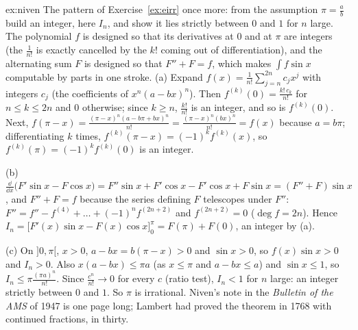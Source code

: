 \begin{solution}{ex:niven}
\idea The pattern of Exercise~\ref{ex:eirr} once more: from the assumption $\pi=\frac ab$ build an integer, here $I_n$, and show it lies strictly between $0$ and $1$ for $n$ large. The polynomial $f$ is designed so that its derivatives at $0$ and at $\pi$ are integers (the $\frac1{n!}$ is exactly cancelled by the $k!$ coming out of differentiation), and the alternating sum $F$ is designed so that $F''+F=f$, which makes $\int f\sin x$ computable by parts in one stroke.
\writeup (a) Expand $f(x)=\frac1{n!}\sum_{j=n}^{2n}c_jx^j$ with integers $c_j$ (the coefficients of $x^n(a-bx)^n$). Then $f^{(k)}(0)=\frac{k!\,c_k}{n!}$ for $n\le k\le2n$ and $0$ otherwise; since $k\ge n$, $\frac{k!}{n!}$ is an integer, and so is $f^{(k)}(0)$. Next, $f(\pi-x)=\frac{(\pi-x)^n(a-b\pi+bx)^n}{n!}=\frac{(\pi-x)^n(bx)^n}{n!}=f(x)$ because $a=b\pi$; differentiating $k$ times, $f^{(k)}(\pi-x)=(-1)^kf^{(k)}(x)$, so $f^{(k)}(\pi)=(-1)^kf^{(k)}(0)$ is an integer.

(b) $\frac{\dd}{\dd x}\bigl(F'\sin x-F\cos x\bigr)=F''\sin x+F'\cos x-F'\cos x+F\sin x=(F''+F)\sin x$, and $F''+F=f$ because the series defining $F$ telescopes under $F''$: $F''=f''-f^{(4)}+\dots+(-1)^nf^{(2n+2)}$ and $f^{(2n+2)}=0$ ($\deg f=2n$). Hence
$I_n=\bigl[F'(x)\sin x-F(x)\cos x\bigr]_0^\pi=F(\pi)+F(0)$, an integer by (a).

(c) On $]0,\pi[$, $x>0$, $a-bx=b(\pi-x)>0$ and $\sin x>0$, so $f(x)\sin x>0$ and $I_n>0$. Also $x(a-bx)\le\pi a$ (as $x\le\pi$ and $a-bx\le a$) and $\sin x\le1$, so $I_n\le\pi\frac{(\pi a)^n}{n!}$. Since $\frac{c^n}{n!}\to0$ for every $c$ (ratio test), $I_n<1$ for $n$ large: an integer strictly between $0$ and $1$. So $\pi$ is irrational.
Niven's note in the \emph{Bulletin of the AMS} of 1947 is one page long; Lambert had proved the theorem in 1768 with continued fractions, in thirty.
\end{solution}

